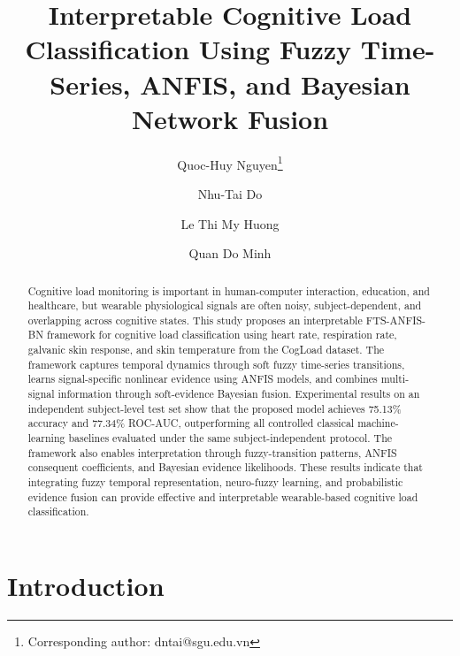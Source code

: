 \documentclass[runningheads]{llncs}
\begin{document}
\title{Interpretable Cognitive Load Classification Using Fuzzy Time-Series, ANFIS, and Bayesian Network Fusion}


\author{Quoc-Huy Nguyen\thanks{Corresponding author: dntai@sgu.edu.vn} \and Nhu-Tai Do \and Le Thi My Huong \and Quan Do Minh}



\maketitle

\begin{abstract}

Cognitive load monitoring is important in human-computer interaction, education, and healthcare, but wearable physiological signals are often noisy, subject-dependent, and overlapping across cognitive states. This study proposes an interpretable FTS-ANFIS-BN framework for cognitive load classification using heart rate, respiration rate, galvanic skin response, and skin temperature from the CogLoad dataset. The framework captures temporal dynamics through soft fuzzy time-series transitions, learns signal-specific nonlinear evidence using ANFIS models, and combines multi-signal information through soft-evidence Bayesian fusion. Experimental results on an independent subject-level test set show that the proposed model achieves 75.13\% accuracy and 77.34\% ROC-AUC, outperforming all controlled classical machine-learning baselines evaluated under the same subject-independent protocol. The framework also enables interpretation through fuzzy-transition patterns, ANFIS consequent coefficients, and Bayesian evidence likelihoods. These results indicate that integrating fuzzy temporal representation, neuro-fuzzy learning, and probabilistic evidence fusion can provide effective and interpretable wearable-based cognitive load classification.


\end{abstract}


\section{Introduction}
\end{document}
